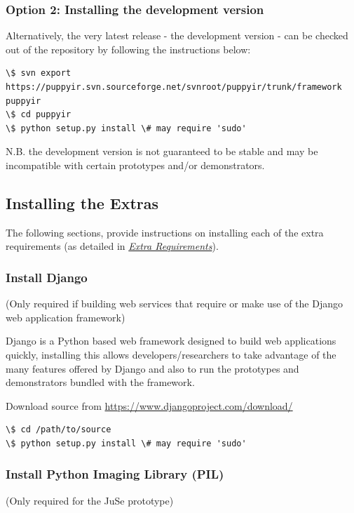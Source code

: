 \documentclass[letterpaper,10pt,english]{sphinxmanual}
\begin{document}
\subsubsection{Option 2: Installing the development version}
\label{installation:option-2-installing-the-development-version}
Alternatively, the very latest release - the development version - can be checked out of the repository by following the instructions below:

\begin{Verbatim}[commandchars=\\\{\}]
\$ svn export https://puppyir.svn.sourceforge.net/svnroot/puppyir/trunk/framework puppyir
\$ cd puppyir
\$ python setup.py install \# may require 'sudo'
\end{Verbatim}

N.B. the development version is not guaranteed to be stable and may be incompatible with certain prototypes and/or demonstrators.


\subsection{Installing the Extras}
\label{installation:installing-the-extras}
The following sections, provide instructions on installing each of the extra requirements (as detailed in {\hyperref[installation:extra-requirements-label]{\emph{Extra Requirements}}}).


\subsubsection{Install Django}
\label{installation:install-django}
(Only required if building web services that require or make use of the Django web application framework)

Django is a Python based web framework designed to build web applications quickly, installing this allows developers/researchers to take advantage of the many features offered by Django and also to run the prototypes and demonstrators bundled with the framework.

Download source from \href{https://www.djangoproject.com/download/}{https://www.djangoproject.com/download/}

\begin{Verbatim}[commandchars=\\\{\}]
\$ cd /path/to/source
\$ python setup.py install \# may require 'sudo'
\end{Verbatim}


\subsubsection{Install Python Imaging Library (PIL)}
\label{installation:install-python-imaging-library-pil}
(Only required for the JuSe prototype)
\end{document}
